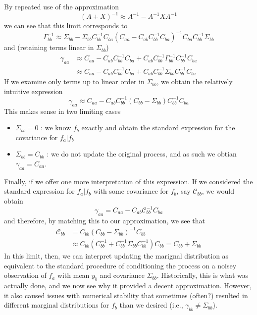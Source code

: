 \documentclass[onecolumn]{article}
\begin{document}
By repeated use of the approximation
\begin{equation}
    (A + X)^{-1} \approx A^{-1} - A^{-1} X A^{-1}
\end{equation}
we can see that this limit corresponds to
\begin{equation}
    \Gamma_{bb}^{-1} \approx \Sigma_{bb} - \Sigma_{bb} C_{bb}^{-1} C_{ba} \left( C_{aa} - C_{ab} C_{bb}^{-1} C_{ba} \right)^{-1} C_{ba} C_{bb}^{-1} \Sigma_{bb}
\end{equation}
and (retaining terms linear in $\Sigma_{bb}$)
\begin{align}
    \gamma_{aa}
        & \approx C_{aa} - C_{ab} C_{bb}^{-1} C_{ba} + C_{ab} C_{bb}^{-1} \Gamma_{bb}^{-1} C_{bb}^{-1} C_{ba} \nonumber \\
        & \approx C_{aa} - C_{ab} C_{bb}^{-1} C_{ba} + C_{ab} C_{bb}^{-1} \Sigma_{bb} C_{bb}^{-1} C_{ba}
\end{align}
If we examine only terms up to linear order in $\Sigma_{bb}$, we obtain the relatively intuitive expression
\begin{equation}
    \gamma_{aa} \approx C_{aa} - C_{ab} C_{bb}^{-1} (C_{bb} - \Sigma_{bb}) C_{bb}^{-1} C_{ba}
\end{equation}
This makes sense in two limiting cases
\begin{itemize}
    \item $\Sigma_{bb}=0$ : we know $f_b$ exactly and obtain the standard expression for the covariance for $f_a|f_b$
    \item $\Sigma_{bb}=C_{bb}$ : we do not update the original process, and as such we obtian $\gamma_{aa} = C_{aa}$.
\end{itemize}

Finally, if we offer one more interpretation of this expression.
If we considered the standard expression for $f_a|f_b$ with some covariance for $f_b$, say $\mathcal{C}_{bb}$, we would obtain
\begin{equation}
    \gamma_{aa} = C_{aa} - C_{ab} \mathcal{C}_{bb}^{-1} C_{ba}
\end{equation}
and therefore, by matching this to our approximation, we see that
\begin{align}
    \mathcal{C}_{bb}
        & = C_{bb} \left( C_{bb} - \Sigma_{bb} \right)^{-1} C_{bb} \nonumber \\
        & \approx C_{bb} \left( C_{bb}^{-1} + C_{bb}^{-1} \Sigma_{bb} C_{bb}^{-1} \right) C_{bb} = C_{bb} + \Sigma_{bb}
\end{align}
In this limit, then, we can interpret updating the marignal distribution as equivalent to the standard procedure of conditioning the process on a noisey observation of $f_a$ with mean $y_b$ and covariance $\Sigma_{bb}$.
Historically, this is what was actually done, and we now see why it provided a decent approximation.
However, it also caused issues with numerical stability that sometimes (often?) resulted in different marginal distributions for $f_b$ than we desired (i.e., $\gamma_{bb} \neq \Sigma_{bb}$).

\end{document}
